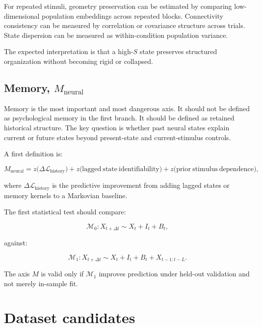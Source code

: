 \documentclass[11pt]{article}
\begin{document}
For repeated stimuli, geometry preservation can be estimated by comparing low-dimensional population embeddings across repeated blocks. Connectivity consistency can be measured by correlation or covariance structure across trials. State dispersion can be measured as within-condition population variance.

The expected interpretation is that a high-$S$ state preserves structured organization without becoming rigid or collapsed.

\subsection{Memory, $M_{\mathrm{neural}}$}

Memory is the most important and most dangerous axis. It should not be defined as psychological memory in the first branch. It should be defined as retained historical structure. The key question is whether past neural states explain current or future states beyond present-state and current-stimulus controls.

A first definition is:

\begin{equation}
M_{\mathrm{neural}} = z\bigl(\Delta \mathcal{L}_{\mathrm{history}}\bigr) + z\bigl(\mathrm{lagged\ state\ identifiability}\bigr) + z\bigl(\mathrm{prior\ stimulus\ dependence}\bigr),
\end{equation}

where $\Delta \mathcal{L}_{\mathrm{history}}$ is the predictive improvement from adding lagged states or memory kernels to a Markovian baseline.

The first statistical test should compare:

\begin{equation}
\mathcal{M}_0: X_{t+\Delta t} \sim X_t + I_t + B_t,
\end{equation}

against:

\begin{equation}
\mathcal{M}_1: X_{t+\Delta t} \sim X_t + I_t + B_t + X_{t-1:t-L}.
\end{equation}

The axis $M$ is valid only if $\mathcal{M}_1$ improves prediction under held-out validation and not merely in-sample fit.

\section{Dataset candidates}
\end{document}
